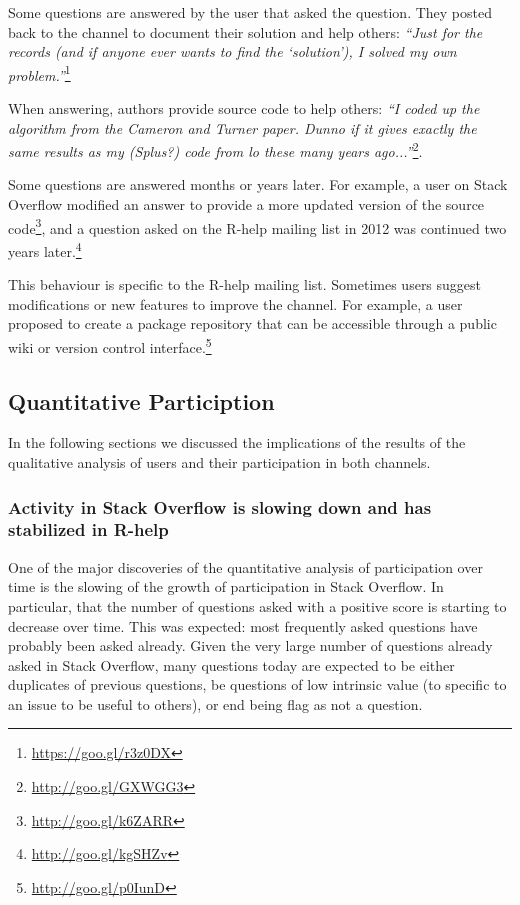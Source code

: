 \documentclass[smallextended]{svjour3}       %
\newcommand{\SO}{Stack Overflow\xspace}
\newcommand{\RH}{R-help\xspace}
\begin{document}
\begin{description}[itemsep=2pt, topsep=0pt, leftmargin=1em, parsep=0pt]
\item[I answered my own question:] Some questions are answered by the user that asked the question. They posted back to the channel to document their solution and help others: \textit{``Just for the records (and if anyone ever wants to find the `solution'), I solved my own problem.''}\footnote{\url{https://goo.gl/r3z0DX}} 
 
\item[I did it for you:] When answering, authors provide source code to help others: \textit{``I coded up the algorithm from the Cameron and Turner paper. Dunno if it gives exactly the same results as my (Splus?) code from lo these many years ago...''}\footnote{\url{http://goo.gl/GXWGG3}}.

\item[Updated or continued years later:] Some questions are answered months or years later.
For example, a user on \SO modified an answer to provide a more updated version of the source code\footnote{\url{http://goo.gl/k6ZARR}}, and a {question asked on the \RH mailing list in 2012 was continued two years later.}\footnote{\url{http://goo.gl/kgSHZv}}

\item[Ideas to improve the channel:] This behaviour is specific to the \RH mailing list. Sometimes users suggest modifications or new features to improve the channel. For example, a {user proposed to create a package repository that can be accessible through a public wiki or version control interface.}\footnote{\url{http://goo.gl/p0IunD}}
\end{description}

\subsection{Quantitative Particiption}

In the following sections we discussed the implications of the results of the qualitative analysis of users and their
participation in both channels.


\subsubsection{Activity in \SO is slowing down and has stabilized in \RH}

One of the major discoveries of the quantitative analysis of participation over time is the slowing of the growth of
participation in \SO. In particular, that the number of questions asked with a positive score is starting to 
decrease over time. This was expected: most frequently asked questions have probably been asked already.  Given the
very large number of questions already asked in \SO, many questions today are expected to be either duplicates of previous
questions, be questions of low intrinsic value (to specific to an issue to be useful to others), or end being flag as
not a question. 
\end{document}
